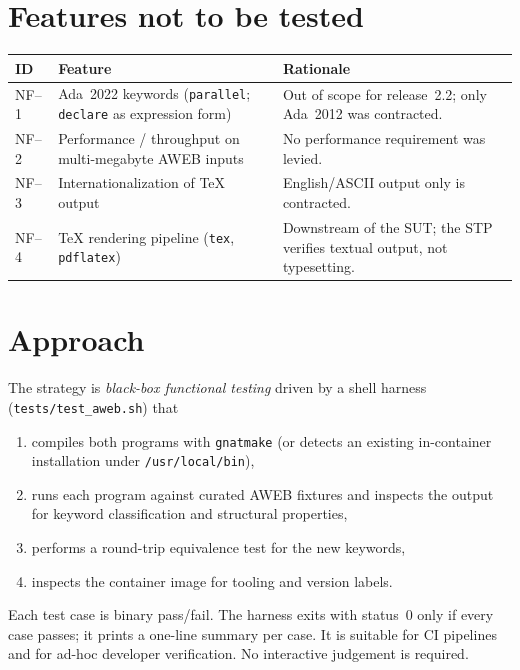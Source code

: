 \documentclass[11pt]{article}
\begin{document}
\section{Features not to be tested}

\begin{center}
\begin{tabularx}{\linewidth}{@{}lXX@{}}
\toprule
ID    & Feature & Rationale\\
\midrule
NF--1 & Ada~2022 keywords (\texttt{parallel}; \texttt{declare} as
        expression form)
      & Out of scope for release~2.2; only Ada~2012 was contracted.\\
NF--2 & Performance / throughput on multi-megabyte AWEB inputs
      & No performance requirement was levied.\\
NF--3 & Internationalization of TeX output
      & English/ASCII output only is contracted.\\
NF--4 & TeX rendering pipeline (\texttt{tex}, \texttt{pdflatex})
      & Downstream of the SUT; the STP verifies textual output, not
        typesetting.\\
\bottomrule
\end{tabularx}
\end{center}

\section{Approach}
The strategy is \emph{black-box functional testing} driven by a shell
harness (\texttt{tests/test\_aweb.sh}) that
\begin{enumerate}[leftmargin=*]
  \item compiles both programs with \texttt{gnatmake} (or detects an
        existing in-container installation under
        \texttt{/usr/local/bin}),
  \item runs each program against curated AWEB fixtures and inspects
        the output for keyword classification and structural
        properties,
  \item performs a round-trip equivalence test for the new keywords,
  \item inspects the container image for tooling and version labels.
\end{enumerate}
Each test case is binary pass/fail.  The harness exits with status~0
only if every case passes; it prints a one-line summary per case.  It is
suitable for CI pipelines and for ad-hoc developer verification.  No
interactive judgement is required.
\end{document}
